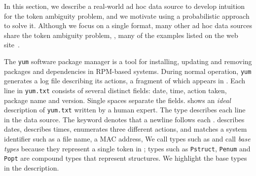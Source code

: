 In this section, we describe a real-world ad hoc data source to
develop intuition for the token ambiguity problem, and we motivate
using a probabilistic approach to solve it. Although we
focus on a single format, many other ad hoc data sources share the
token ambiguity problem, \eg{}, many of the examples listed on the
\pads{} web site~\cite{padsweb}.

The {\tt yum} software package manager is a tool for installing,
updating and removing packages and dependencies in RPM-based systems.   
During normal operation, {\tt yum} generates a log file describing its
actions, a fragment of which appears in . 
%
%
Each line in {\tt yum.txt} consists of several distinct fields: 
date, time, action taken, package name and version. 
Single spaces separate the fields.
 shows an {\em ideal} \pads{} description of
{\tt yum.txt} written by a human expert.
The  type describes each line in the data source.
The keyword  denotes that a newline follows each .
 describes dates,  describes times, 
 enumerates three different actions,
and  matches a system identifier such as a file
name, a MAC address, \etc{} We call types such as  and 
call {\em base types} because they represent a single token 
in \pads{}; types such as {\tt Pstruct}, {\tt Penum} and {\tt Popt} are 
compound types that represent
structures. We highlight the base types in the \pads{} description. 

